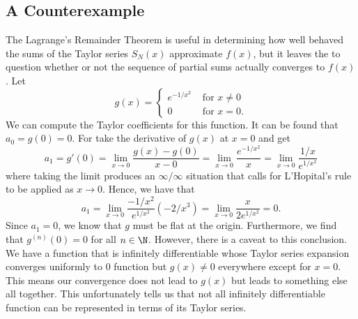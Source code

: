 \subsection{A Counterexample}

The Lagrange's Remainder Theorem is useful in determining how well behaved the sums of the Taylor series \( S_N(x) \) approximate \( f(x) \), but it leaves the to question whether or not the sequence of partial sums actually converges to \( f(x) \). Let 
\[  g(x) = 
\begin{cases}
    e^{-1/x^2} &\text{ for } x \neq 0  \\
    0 &\text{ for } x = 0. 
\end{cases} \]
We can compute the Taylor coefficients for this function. It can be found that \( a_{0 }= g(0) = 0  \). For take the derivative of \( g(x)  \) at \( x = 0  \)  and get 
\[  a_1 = g'(0) = \lim_{ x \to 0 }  \frac{ g(x) - g(0)  }{ x - 0  } = \lim_{ x \to 0 }  \frac{ e^{-1/x^2} }{ x  } = \lim_{ x \to 0 }  \frac{ 1 /x  }{ e^{1/x^2} }   \] where taking the limit produces an \( \infty / \infty \) situation that calls for L'Hopital's rule to be applied as \( x \to 0  \). Hence, we have that 
\[  a_{1} = \lim_{ x \to 0 }  \frac{ -1/x^2  }{  e^{1/x^2} } (-2/x^3) = \lim_{ x \to 0  } \frac{ x }{ 2 e^{1/x^2} } = 0.\]
Since \( a_1 = 0  \), we know that \( g  \) must be flat at the origin. Furthermore, we find that \( g^{(n)}(0) = 0  \) for all \( n \in \N  \).
However, there is a caveat to this conclusion. We have a function that is infinitely differentiable whose Taylor series expansion converges uniformly to \( 0  \) function but \( g(x) \neq 0  \) everywhere except for \( x = 0  \). This means our convergence does not lead to \( g(x)  \) but leads to something else all together. This unfortunately tells us that not all infinitely differentiable function can be represented in terms of its Taylor series.

